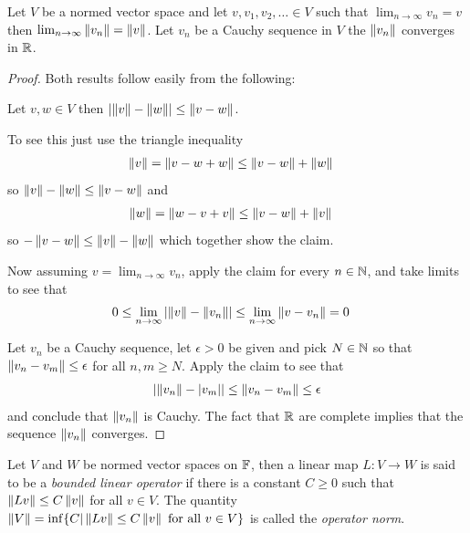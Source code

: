 \begin{prop}\label{banach:ConvergenceOfNorms} Let $V$ be a normed
  vector space and let $v, v_1, v_2, \dotsc \in V$ such that
  $\lim_{n  \to \infty} v_n  = v$
  then $\lim_{n\to \infty} \left \lVert v_n \right \rVert = \left \lVert v \right \rVert$.   Let $v_n$ be a
    Cauchy sequence in $V$ the $\left \lVert v_n \right \rVert$ converges in $\mathbb{R}$.
\end{prop}
\begin{proof}
  Both results follow easily from the following:
  \begin{clm}Let $v,w \in V$ then $\left \vert \left \lVert v \right \rVert - \left \lVert w \right \rVert \right \vert \leq
    \left \lVert v - w \right \rVert$.
  \end{clm}
  To see this just use the triangle inequality
  \begin{align*}
    \left \lVert v \right \rVert &= \left \lVert v - w + w \right \rVert \leq \left \lVert v - w \right \rVert + \left \lVert w \right \rVert
  \end{align*}
  so $\left \lVert v \right \rVert - \left \lVert w \right \rVert \leq \left \lVert v - w \right \rVert$ and 
  \begin{align*}
    \left \lVert w \right \rVert &= \left \lVert w - v + v \right \rVert \leq \left \lVert v - w \right \rVert + \left \lVert v \right \rVert
  \end{align*}
  so $-\left \lVert v - w \right \rVert  \leq \left \lVert v \right \rVert  - \left \lVert w \right \rVert$ which together show the claim.

  
  Now assuming $v = \lim_{n \to \infty} v_n$, apply the claim for every $n \in \mathbb{N}$,  and   take limits to see that
   \begin{align*}
     0 &\leq \lim_{n \to \infty} \left \vert \left \lVert v \right \rVert - \left \lVert v_n \right \rVert \right \vert \leq
         \lim_{n \to \infty}  \left \lVert v - v_n \right \rVert = 0
   \end{align*}

   Let $v_n$ be a Cauchy sequence, let $\epsilon > 0$ be given and
   pick $N \in \mathbb{N}$ so that $\left \lVert v_n - v_m \right \rVert \leq \epsilon$ for
   all $n, m \geq N$.  Apply the claim to see that
   \begin{align*}
     \left \vert \left \lVert v_n \right \rVert-\left \vert v_m \right \vert \right \vert \leq \left \lVert v_n - v_m \right \rVert \leq \epsilon
   \end{align*}
   and conclude that $\left \lVert v_n \right \rVert$ is Cauchy.  The fact that $\mathbb{R}$
   are complete implies that the sequence $\left \lVert v_n \right \rVert$ converges.
\end{proof}

\begin{defn}Let $V$ and $W$ be normed vector spaces on $\mathbb{F}$, then
  a linear map $L : V \to W$ is said to be a \emph{bounded linear operator} if there is
  a constant $C \geq 0$ such that $\left \lVert Lv \right \rVert \leq C \left \lVert v \right \rVert$ for all
  $v \in V$.  The quantity $\left \lVert V \right \rVert = \inf \lbrace C | \left \lVert Lv \right \rVert
  \leq C \left \lVert v \right \rVert \text { for all } v \in V\rbrace$ is called the
  \emph{operator norm}.
\end{defn}

